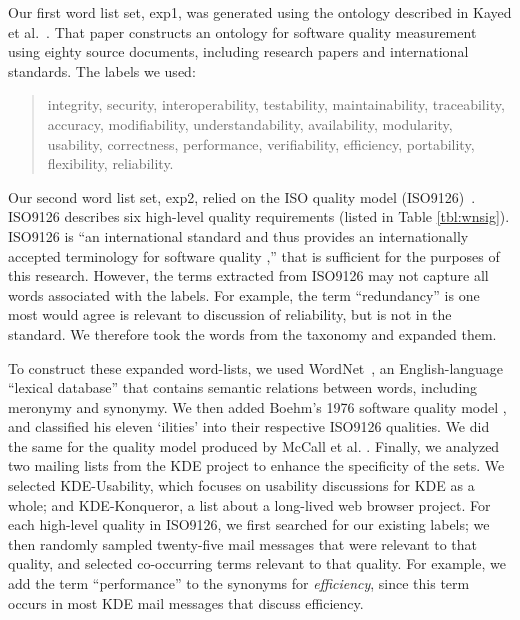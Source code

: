 \documentclass{acm_proc_article-sp}
\begin{document}
Our first word list set, \textsf{exp1}, was generated using the ontology described in Kayed et al.~\cite{5072519}. That paper constructs an ontology for software quality measurement using eighty source documents, including research papers and international standards. The labels we used:
\begin{quotation}
\small \noindent \textsf{
integrity, security,
interoperability, testability, maintainability, traceability,
accuracy, modifiability, understandability, availability, modularity,
usability, correctness, performance, verifiability, efficiency,
portability, flexibility, reliability.
}
\end{quotation}

Our second word list set, \textsf{exp2}, relied on the ISO quality model (ISO9126)~\cite{iso9126}. ISO9126 describes six high-level quality requirements (listed in Table \ref{tbl:wnsig}). 
ISO9126 is ``an international standard and thus provides an internationally accepted terminology for software quality \cite[p. 58]{Bøegh2008},'' that is sufficient for the purposes of this research.
However, the terms extracted from ISO9126 may not capture all words associated with the labels.  For example, the term ``redundancy'' is one most would agree is relevant to discussion of reliability, but is not in the standard. We therefore took the words from the taxonomy and expanded them.


To construct these expanded word-lists, we used WordNet~\cite{Fellbaum1998}, an English-language ``lexical database'' that contains semantic relations between words, including meronymy and synonymy. We then added Boehm’s 1976 software quality model \cite{Boehm+:1976:ICSE}, and classified his eleven ‘ilities’ into their respective ISO9126 qualities. We did the same for the quality model produced by McCall et al. \cite{mccall1977}. Finally, we analyzed two mailing lists from the KDE project to enhance the specificity of the sets. We selected KDE-Usability, which focuses on usability discussions for KDE as a whole; and KDE-Konqueror, a list about a long-lived web browser project. For each high-level quality in ISO9126, we first searched for our existing labels; we then randomly sampled twenty-five mail messages that were relevant to that quality, and selected co-occurring terms relevant to that quality. For example, we add the term ``performance'' to the synonyms for \emph{efficiency}, since this term occurs in most KDE mail messages that discuss efficiency.
\end{document}
